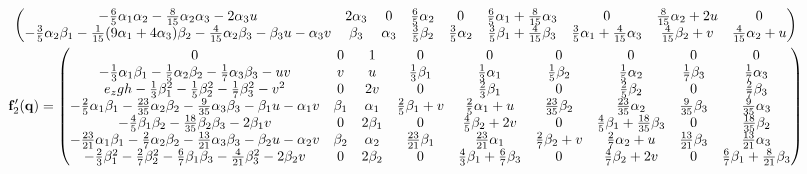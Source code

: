 \documentclass{article}
\begin{document}
\begin{gather}
\begin{pmatrix}
          -\frac{6}{5} \alpha_{1} \alpha_{2} - \frac{8}{15} \alpha_{2} \alpha_{3} - 2 \alpha_{3} u & 2 \alpha_{3} & 0 & \frac{6}{5} \alpha_{2} & 0 & \frac{6}{5} \alpha_{1} + \frac{8}{15} \alpha_{3} & 0 & \frac{8}{15} \alpha_{2} + 2 u & 0 \\
          -\frac{3}{5} \alpha_{2} \beta_{1} - \frac{1}{15} {\left(9 \alpha_{1} + 4 \alpha_{3}\right)} \beta_{2} - \frac{4}{15} \alpha_{2} \beta_{3} - \beta_{3} u - \alpha_{3} v & \beta_{3} & \alpha_{3} & \frac{3}{5} \beta_{2} & \frac{3}{5} \alpha_{2} & \frac{3}{5} \beta_{1} + \frac{4}{15} \beta_{3} & \frac{3}{5} \alpha_{1} + \frac{4}{15} \alpha_{3} & \frac{4}{15} \beta_{2} + v & \frac{4}{15} \alpha_{2} + u
        \end{pmatrix} \\
        \mathbf{f}_2'(\mathbf{q}) =
        \begin{pmatrix}
          0 & 0 & 1 & 0 & 0 & 0 & 0 & 0 & 0 \\
          -\frac{1}{3} \alpha_{1} \beta_{1} - \frac{1}{5} \alpha_{2} \beta_{2} - \frac{1}{7} \alpha_{3} \beta_{3} - u v & v & u & \frac{1}{3} \beta_{1} & \frac{1}{3} \alpha_{1} & \frac{1}{5} \beta_{2} & \frac{1}{5} \alpha_{2} & \frac{1}{7} \beta_{3} & \frac{1}{7} \alpha_{3} \\
          e_{z} g h - \frac{1}{3} \beta_{1}^{2} - \frac{1}{5} \beta_{2}^{2} - \frac{1}{7} \beta_{3}^{2} - v^{2} & 0 & 2 v & 0 & \frac{2}{3} \beta_{1} & 0 & \frac{2}{5} \beta_{2} & 0 & \frac{2}{7} \beta_{3} \\
          -\frac{2}{5} \alpha_{1} \beta_{1} - \frac{23}{35} \alpha_{2} \beta_{2} - \frac{9}{35} \alpha_{3} \beta_{3} - \beta_{1} u - \alpha_{1} v & \beta_{1} & \alpha_{1} & \frac{2}{5} \beta_{1} + v & \frac{2}{5} \alpha_{1} + u & \frac{23}{35} \beta_{2} & \frac{23}{35} \alpha_{2} & \frac{9}{35} \beta_{3} & \frac{9}{35} \alpha_{3} \\
          -\frac{4}{5} \beta_{1} \beta_{2} - \frac{18}{35} \beta_{2} \beta_{3} - 2 \beta_{1} v & 0 & 2 \beta_{1} & 0 & \frac{4}{5} \beta_{2} + 2 v & 0 & \frac{4}{5} \beta_{1} + \frac{18}{35} \beta_{3} & 0 & \frac{18}{35} \beta_{2} \\
          -\frac{23}{21} \alpha_{1} \beta_{1} - \frac{2}{7} \alpha_{2} \beta_{2} - \frac{13}{21} \alpha_{3} \beta_{3} - \beta_{2} u - \alpha_{2} v & \beta_{2} & \alpha_{2} & \frac{23}{21} \beta_{1} & \frac{23}{21} \alpha_{1} & \frac{2}{7} \beta_{2} + v & \frac{2}{7} \alpha_{2} + u & \frac{13}{21} \beta_{3} & \frac{13}{21} \alpha_{3} \\
          -\frac{2}{3} \beta_{1}^{2} - \frac{2}{7} \beta_{2}^{2} - \frac{6}{7} \beta_{1} \beta_{3} - \frac{4}{21} \beta_{3}^{2} - 2 \beta_{2} v & 0 & 2 \beta_{2} & 0 & \frac{4}{3} \beta_{1} + \frac{6}{7} \beta_{3} & 0 & \frac{4}{7} \beta_{2} + 2 v & 0 & \frac{6}{7} \beta_{1} + \frac{8}{21} \beta_{3} \\

\end{pmatrix}
\end{gather}
\end{document}
